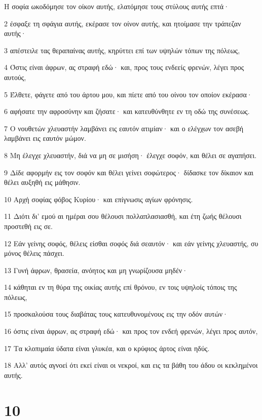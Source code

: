 \par Η σοφία ωκοδόμησε τον οίκον αυτής, ελατόμησε τους στύλους αυτής επτά·
\par 2 έσφαξε τη σφάγια αυτής, εκέρασε τον οίνον αυτής, και ητοίμασε την τράπεζαν αυτής·
\par 3 απέστειλε τας θεραπαίνας αυτής, κηρύττει επί των υψηλών τόπων της πόλεως,
\par 4 Όστις είναι άφρων, ας στραφή εδώ· και, προς τους ενδεείς φρενών, λέγει προς αυτούς,
\par 5 Έλθετε, φάγετε από του άρτου μου, και πίετε από του οίνου τον οποίον εκέρασα·
\par 6 αφήσατε την αφροσύνην και ζήσατε· και κατευθύνθητε εν τη οδώ της συνέσεως.
\par 7 Ο νουθετών χλευαστήν λαμβάνει εις εαυτόν ατιμίαν· και ο ελέγχων τον ασεβή λαμβάνει εις εαυτόν μώμον.
\par 8 Μη έλεγχε χλευαστήν, διά να μη σε μισήση· έλεγχε σοφόν, και θέλει σε αγαπήσει.
\par 9 Δίδε αφορμήν εις τον σοφόν και θέλει γείνει σοφώτερος· δίδασκε τον δίκαιον και θέλει αυξηθή εις μάθησιν.
\par 10 Αρχή σοφίας φόβος Κυρίου· και επίγνωσις αγίων φρόνησις.
\par 11 Διότι δι' εμού αι ημέραι σου θέλουσι πολλαπλασιασθή, και έτη ζωής θέλουσι προστεθή εις σε.
\par 12 Εάν γείνης σοφός, θέλεις είσθαι σοφός διά σεαυτόν· και εάν γείνης χλευαστής, συ μόνος θέλεις πάσχει.
\par 13 Γυνή άφρων, θρασεία, ανόητος και μη γνωρίζουσα μηδέν·
\par 14 κάθηται εν τη θύρα της οικίας αυτής επί θρόνου, εν τοις υψηλοίς τόποις της πόλεως,
\par 15 προσκαλούσα τους διαβάτας τους κατευθυνομένους εις την οδόν αυτών·
\par 16 όστις είναι άφρων, ας στραφή εδώ· και προς τον ενδεή φρενών, λέγει προς αυτόν,
\par 17 Τα κλοπιμαία ύδατα είναι γλυκέα, και ο κρύφιος άρτος είναι ηδύς.
\par 18 Αλλ' αυτός αγνοεί ότι εκεί είναι οι νεκροί, και εις τα βάθη του άδου οι κεκλημένοι αυτής.

\chapter{10}

